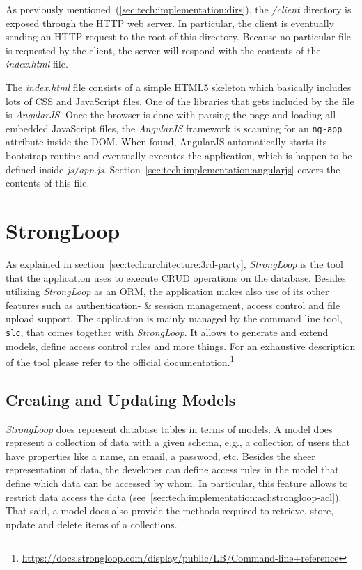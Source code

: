 \documentclass[nochapterpage,nopartpage,noheadingspace,numbersubsubsec,bigchapter,colorback,accentcolor=tud9c,10pt]{tudreport}
\begin{document}
    As previously mentioned~(\ref{sec:tech:implementation:dirs}), the \emph{/client} directory is exposed through the HTTP web server. In particular, the client is eventually sending an HTTP request to the root of this directory. Because no particular file is requested by the client, the server will respond with the contents of the \emph{index.html} file.

    The \emph{index.html} file consists of a simple HTML5 skeleton which basically includes lots of CSS and JavaScript files. One of the libraries that gets included by the file is \emph{AngularJS}. Once the browser is done with parsing the page and loading all embedded JavaScript files, the \emph{AngularJS} framework is scanning for an \texttt{ng-app} attribute inside the DOM. When found, AngularJS automatically starts its bootstrap routine and eventually executes the application, which is happen to be defined inside \emph{js/app.js}. Section~\ref{sec:tech:implementation:angularjs} covers the contents of this file.

  \section{StrongLoop}
  \label{sec:tech:implementation:strongloop}

    As explained in section~\ref{sec:tech:architecture:3rd-party}, \emph{StrongLoop} is the tool that the application uses to execute CRUD operations on the database. Besides utilizing \emph{StrongLoop} as an ORM, the application makes also use of its other features such as authentication- \& session management, access control and file upload support. The application is mainly managed by the command line tool, \texttt{slc}, that comes together with \emph{StrongLoop}. It allows to generate and extend models, define access control rules and more things. For an exhaustive description of the tool please refer to the official documentation.\footnote{\url{https://docs.strongloop.com/display/public/LB/Command-line+reference}}

  \subsection{Creating and Updating Models}
  \label{sec:tech:implementation:strongloop:models}

    \emph{StrongLoop} does represent database tables in terms of models. A model does represent a collection of data with a given schema, e.g., a collection of users that have properties like a name, an email, a password, etc. Besides the sheer representation of data, the developer can define access rules in the model that define which data can be accessed by whom. In particular, this feature allows to restrict data access {} the data (see~\ref{sec:tech:implementation:acl:strongloop-acl}). That said, a model does also provide the methods required to retrieve, store, update and delete items of a collections.
\end{document}
